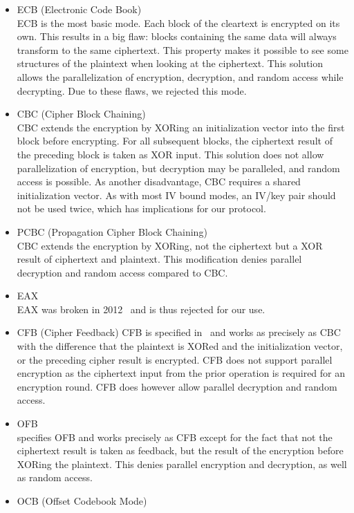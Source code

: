 \begin{itemize}
	\item ECB (Electronic Code Book)\\
	ECB is the most basic mode. Each block of the cleartext is encrypted on its own. This results in a big flaw: blocks containing the same data will always transform to the same ciphertext. This property makes it possible to see some structures of the plaintext when looking at the ciphertext. This solution allows the parallelization of encryption, decryption, and random access while decrypting. Due to these flaws, we rejected this mode.
	\item CBC (Cipher Block Chaining)\\  
	CBC extends the encryption by XORing an initialization vector into the first block before encrypting. For all subsequent blocks, the ciphertext result of the preceding block is taken as XOR input. This solution does not allow parallelization of encryption, but decryption may be paralleled, and random access is possible. As another disadvantage, CBC requires a shared initialization vector. As with most IV bound modes, an IV/key pair should not be used twice, which has implications for our protocol.
	\item PCBC (Propagation Cipher Block Chaining)\\
	CBC extends the encryption by XORing, not the ciphertext but a XOR result of ciphertext and plaintext. This modification denies parallel decryption and random access compared to CBC.
	\item EAX\\      
	EAX was broken in 2012~\cite{minematsu2013attacks} and is thus rejected for our use.
	\item CFB (Cipher Feedback)
	CFB is specified in~\cite{dworkin2001recommendation} and works as precisely as CBC with the difference that the plaintext is XORed and the initialization vector, or the preceding cipher result is encrypted. CFB does not support parallel encryption as the ciphertext input from the prior operation is required for an encryption round. CFB does however allow parallel decryption and random access.
	\item OFB\\
	\cite{dworkin2001recommendation} specifies OFB and works precisely as CFB except for the fact that not the ciphertext result is taken as feedback, but the result of the encryption before XORing the plaintext. This denies parallel encryption and decryption, as well as random access.
	\item OCB (Offset Codebook Mode)\\

\end{itemize}
